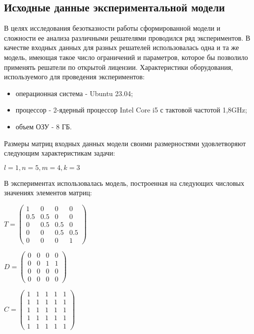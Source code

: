 \subsection*{Исходные данные экспериментальной модели}
В целях исследования безотказности работы сформированной модели и сложности ее анализа различными решателями проводился ряд экспериментов. В качестве входных данных для разных решателей использовалась одна и та же модель, имеющая такое число ограничений и параметров, которое бы позволило применять решатели по открытой лицензии.
Характеристики оборудования, используемого для проведения экспериментов:
\begin{itemize}
  \item операционная система - Ubuntu 23.04;
  \item процессор - 2-ядерный процессор Intel Core i5 с тактовой частотой 1,8GHz;
  \item объем ОЗУ - 8 ГБ.
\end{itemize}

Размеры матриц входных данных модели своими размерностями удовлетворяют следующим характеристикам задачи:
\begin{center}
  $l = 1, n = 5, m = 4, k = 3$
\end{center}

В экспериментах использовалась модель, построенная на следующих числовых значениях элементов матриц:
\begin{center}
  $
  T = 
  \begin{pmatrix}
      1 &   0 &   0 & 0   \\
    0.5 & 0.5 &   0 & 0   \\
      0 & 0.5 & 0.5 & 0   \\
      0 &   0 & 0.5 & 0.5 \\
      0 &   0 &   0 & 1 
  \end{pmatrix}
  $
\end{center}

\begin{center}
  $
  D = 
  \begin{pmatrix}
    0 & 0 & 0 & 0   \\
    0 & 0 & 1 & 1   \\
    0 & 0 & 0 & 0   \\
    0 & 0 & 0 & 0 
  \end{pmatrix}
  $
\end{center}

\begin{center}
  $
  C = 
  \begin{pmatrix}
    1 & 1 & 1 & 1 & 1   \\
    1 & 1 & 1 & 1 & 1   \\
    1 & 1 & 1 & 1 & 1   \\
    1 & 1 & 1 & 1 & 1   \\
    1 & 1 & 1 & 1 & 1 
  \end{pmatrix}
  $
\end{center}

